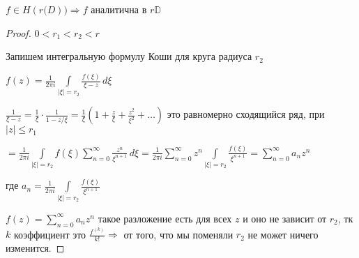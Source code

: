
\begin{theorem}\thmslashn
	
	$f\in H(r \mathbb(D)) \Rightarrow f$ аналитична в $r \mathbb{D}$ 
	
\end{theorem}

\begin{proof}\thmslashn
	
	$0 < r_1 < r_2 < r$
	
	Запишем интегральную формулу Коши для круга радиуса $r_2$ 
	
	$f(z) = \frac{1}{2\pi i} \int\limits_{|\xi| = r_2} \frac{f(\xi)}{\xi-z}\,d\xi$
	
	$\frac{1}{\xi - z} = \frac{1}{\xi} \cdot \frac{1}{1 - z/\xi} = \frac{1}{\xi} \left( 1 + \frac{z}{\xi} + \frac{z^2}{\xi^2} + \ldots \right)$ это равномерно сходящийся ряд, при $|z| \leqslant r_1$
	
	$= \frac{1}{2\pi i} \int\limits_{|\xi| = r_2} f(\xi) \sum\limits_{n = 0}^{\infty} \frac{z^n}{\xi^{n+1}}\,d\xi = \frac{1}{2\pi i}\sum\limits_{n = 0}^{\infty} z^n \int\limits_{|\xi| = r_2} \frac{f(\xi)}{\xi^{n+1}} = \sum\limits_{n = 0}^{\infty} a_n z^n$
	
	где $a_n =  \frac{1}{2\pi i}\int\limits_{|\xi| = r_2} \frac{f(\xi)}{\xi^{n+1}}$
	
	$f(z) = \sum\limits_{n = 0}^{\infty} a_n z^n$ такое разложение есть для всех  $z$ и оно не зависит от $r_2$, тк $k$ коэффициент это $\frac{f^{(k)}}{k!} \Rightarrow$ от того, что мы поменяли $r_2$ не может ничего изменится.
	
	
\end{proof}

